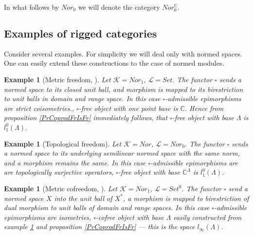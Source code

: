 \documentclass[12pt]{article}
\newtheorem{example}[theorem]{Example}
\begin{document}
In what follows by $Nor_0$ we will denote the category $Nor_0^\mathbb{C}$.






































\subsection{Examples of rigged categories}

Consider several examples. For simplicity we will deal only with normed spaces. One can easily extend these constructions to the case of normed modules.

\begin{example}[Metric freedom, \cite{HelMetrFrQmod}]\label{ExMetrFr}
Let $\mathcal{K} = Nor_1$, $\mathcal{L} = Set$. The functor $\square$ sends a normed space to its closed unit ball, and morphism is mapped to its birestriction to unit balls in domain and range space. In this case $\square$-admissible epimorphisms are strict coisometries., $\square$-free object with one point base is $\mathbb{C}$. Hence from proposition \ref{PrCoprodFrIsFr} 
immediately follows, that $\square$-free object with base $\Lambda$ is $l_1^0(\Lambda)$.
\end{example}

\begin{example}[Topological freedom]\label{ExTopFr}
Let $\mathcal{K} = Nor$, $\mathcal{L} = Nor_0$. The functor $\square$ sends a normed space to its underlying semilinear normed space with the same norm, and a morphism remains the same. In this case $\square$-admissible epimorphisms are are topologically surjective operators, $\square$-free object with base $\mathbb{C}^\Lambda$ is $l_1^0(\Lambda)$.
\end{example}

\begin{example}[Metric cofreedom, \cite{HelMetrFrQmod}]\label{ExMetrCoFr}
Let $\mathcal{K} = Nor_1$, $\mathcal{L} = Set^0$. The functor $\square$ send a normed space $X$ into the unit ball of $X^*$, a morphism is mapped to birestriction of dual morphism to unit balls of domain and range spaces. In this case $\square$-admissible epimorphisms are isometries, $\square$-cofree object with base $\Lambda$ easily constructed from example \ref{ExMetrFr} 
and proposition \ref{PrCoprodFrIsFr} --- this is the space $l_\infty(\Lambda)$.
\end{example}
\end{document}
